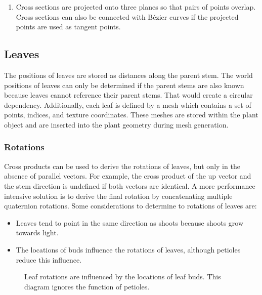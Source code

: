 \documentclass[10pt]{article}
\begin{document}
\begin{enumerate}
\item Cross sections are projected onto three planes so that pairs of points overlap. Cross sections can also be connected with B\'{e}zier curves if the projected points are used as tangent points.
\end{enumerate}

\subsection{Leaves}
The positions of leaves are stored as distances along the parent stem. The world positions of leaves can only be determined if the parent stems are also known because leaves cannot reference their parent stems. That would create a circular dependency. Additionally, each leaf is defined by a mesh which contains a set of points, indices, and texture coordinates. These meshes are stored within the plant object and are inserted into the plant geometry during mesh generation.

\subsubsection{Rotations}
\begin{minipage}[t]{0.6\textwidth}
Cross products can be used to derive the rotations of leaves, but only in the absence of parallel vectors. For example, the cross product of the up vector and the stem direction is undefined if both vectors are identical. A more performance intensive solution is to derive the final rotation by concatenating multiple quaternion rotations. Some considerations to determine to rotations of leaves are:
\begin{itemize}
\item Leaves tend to point in the same direction as shoots because shoots grow towards light.
\item The locations of buds influence the rotations of leaves, although petioles reduce this influence.
\end{itemize}
\end{minipage}
\hfill
\begin{minipage}[t]{0.3\textwidth}
 \begin{figure}[H]
  \centering
  
  \caption{Leaf rotations are influenced by the locations of leaf buds. This diagram ignores the function of petioles.}
 \end{figure}
\end{minipage}
\end{document}

